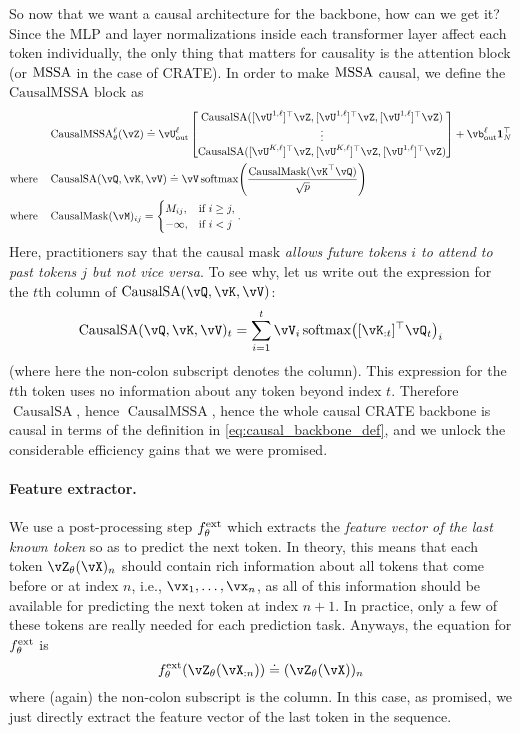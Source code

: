 \documentclass[../../book-main.tex]{subfiles}
\begin{document}
So now that we want a causal architecture for the backbone, how can we get it? Since the MLP and layer normalizations inside each transformer layer affect each token individually, the only thing that matters for causality is the attention block (or \(\operatorname{MSSA}\) in the case of CRATE). In order to make \(\operatorname{MSSA}\) causal, we define the \(\mathrm{CausalMSSA}\) block as 
\begin{align}
    &\operatorname{CausalMSSA}_{\theta}^{\ell}(\vZ) \doteq \vU_{\out}^{\ell}\mat{\operatorname{CausalSA}([\vU^{1, \ell}]^{\top}\vZ, [\vU^{1, \ell}]^{\top}\vZ, [\vU^{1, \ell}]^{\top}\vZ) \\ \vdots \\ \operatorname{CausalSA}([\vU^{K, \ell}]^{\top}\vZ, [\vU^{K, \ell}]^{\top}\vZ, [\vU^{1, \ell}]^{\top}\vZ)} + \vb_{\out}^{\ell}\vone_{N}^{\top} \\ 
    \text{where} \quad & \operatorname{CausalSA}(\vQ, \vK, \vV) \doteq \vV\softmax\rp{\frac{\operatorname{CausalMask}(\vK^{\top}\vQ)}{\sqrt{p}}} \\ 
    \text{where} \quad & \operatorname{CausalMask}(\vM)_{ij} = \casework{M_{ij}, & \text{if}\ i \geq j, \\ -\infty, & \text{if}\ i < j}.
\end{align}
Here, practitioners say that the causal mask \textit{allows future tokens \(i\) to attend to past tokens \(j\) but not vice versa}. To see why, let us write out the expression for the \(t\)th column of \(\operatorname{CausalSA}(\vQ, \vK, \vV)\):
\begin{equation}
    \operatorname{CausalSA}(\vQ, \vK, \vV)_{t} = \sum_{i = 1}^{t}\vV_{i}\softmax\rp{[\vK_{:t}]^{\top}\vQ_{t}}_{i}
\end{equation}
(where here the non-colon subscript denotes the column). This expression for the \(t\)th token uses no information about any token beyond index \(t\). Therefore \(\operatorname{CausalSA}\), hence \(\operatorname{CausalMSSA}\), hence the whole causal CRATE backbone is causal in terms of the definition in \eqref{eq:causal_backbone_def}, and we unlock the considerable efficiency gains that we were promised. 

\paragraph{Feature extractor.} We use a post-processing step \(f_{\theta}^{\mathrm{ext}}\) which extracts the \textit{feature vector of the last known token} so as to predict the next token. In theory, this means that each token \(\vZ_{\theta}(\vX)_{n}\) should contain rich information about all tokens that come before or at index \(n\), i.e., \(\vx_{1}, \dots, \vx_{n}\), as all of this information should be available for predicting the next token at index \(n + 1\). In practice, only a few of these tokens are really needed for each prediction task. Anyways, the equation for \(f_{\theta}^{\mathrm{ext}}\) is 
\begin{equation}
    f_{\theta}^{\ext}(\vZ_{\theta}(\vX_{:n})) \doteq (\vZ_{\theta}(\vX))_{n}
\end{equation}
where (again) the non-colon subscript is the column. In this case, as promised, we just directly extract the feature vector of the last token in the sequence.
\end{document}
